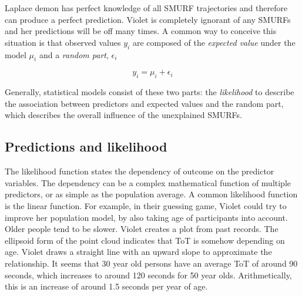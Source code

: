 \documentclass[]{svmono}
\newenvironment{Shaded}{\begin{snugshade}}{\end{snugshade}}
\newcommand{\KeywordTok}[1]{\textcolor[rgb]{0.13,0.29,0.53}{\textbf{#1}}}
\newcommand{\DataTypeTok}[1]{\textcolor[rgb]{0.13,0.29,0.53}{#1}}
\newcommand{\StringTok}[1]{\textcolor[rgb]{0.31,0.60,0.02}{#1}}
\newcommand{\OperatorTok}[1]{\textcolor[rgb]{0.81,0.36,0.00}{\textbf{#1}}}
\newcommand{\NormalTok}[1]{#1}
\theoremstyle{definition}
\theoremstyle{definition}
\theoremstyle{definition}
\theoremstyle{remark}
\begin{document}
Laplace demon has perfect knowledge of all SMURF trajectories and
therefore can produce a perfect prediction. Violet is completely
ignorant of any SMURFs and her predictions will be off many times. A
common way to conceive this situation is that observed values \(y_i\)
are composed of the \emph{expected value} under the model \(\mu_i\) and
a \emph{random part}, \(\epsilon_i\)

\[y_i = \mu_i + \epsilon_i\]

Generally, statistical models consist of these two parts: the
\emph{likelihood} to describe the association between predictors and
expected values and the random part, which describes the overall
influence of the unexplained SMURFs.

\subsection{Predictions and
likelihood}\label{predictions-and-likelihood}

The likelihood function states the dependency of outcome on the
predictor variables. The dependency can be a complex mathematical
function of multiple predictors, or as simple as the population average.
A common likelihood function is the linear function. For example, in
their guessing game, Violet could try to improve her population model,
by also taking age of participants into account. Older people tend to be
slower. Violet creates a plot from past records. The ellipsoid form of
the point cloud indicates that ToT is somehow depending on age. Violet
draws a straight line with an upward slope to approximate the
relationship. It seems that 30 year old persons have an average ToT of
around 90 seconds, which increases to around 120 seconds for 50 year
olds. Arithmetically, this is an increase of around 1.5 seconds per year
of age.

\begin{Shaded}
\end{Shaded}
\end{document}
